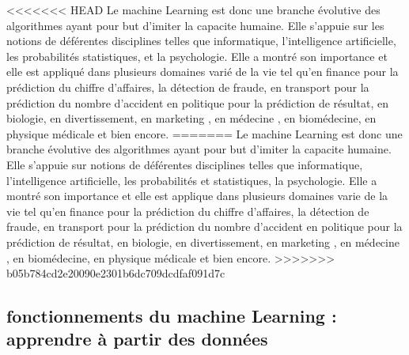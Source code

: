 \documentclass[french,a4paper,12pt]{article}
\begin{document}
<<<<<<< HEAD
\quad Le machine Learning est donc une branche évolutive des algorithmes ayant pour but d’imiter la capacite humaine. Elle s’appuie sur les  notions de déférentes disciplines telles que informatique, l’intelligence artificielle, les probabilités  statistiques, et la psychologie.  Elle a montré son importance et elle est appliqué dans plusieurs domaines varié de la vie tel qu’en finance pour la prédiction du chiffre d’affaires, la détection de fraude, en transport pour la prédiction du nombre d’accident en politique pour la prédiction de résultat, en biologie, en divertissement, en marketing , en médecine , en biomédecine, en physique médicale et bien encore.
=======
\quad Le machine Learning est donc une branche évolutive des algorithmes ayant pour but d’imiter la capacite humaine. Elle s’appuie sur notions de déférentes disciplines telles que informatique, l’intelligence artificielle, les probabilités et statistiques, la psychologie.  Elle a montré son importance et elle est applique dans plusieurs domaines varie de la vie tel qu’en finance pour la prédiction du chiffre d’affaires, la détection de fraude, en transport pour la prédiction du nombre d’accident en politique pour la prédiction de résultat, en biologie, en divertissement, en marketing , en médecine , en biomédecine, en physique médicale et bien encore.
>>>>>>> b05b784cd2e20090e2301b6dc709dcdfaf091d7c




\subsection{ fonctionnements du machine Learning : apprendre à partir des données }
\end{document}
